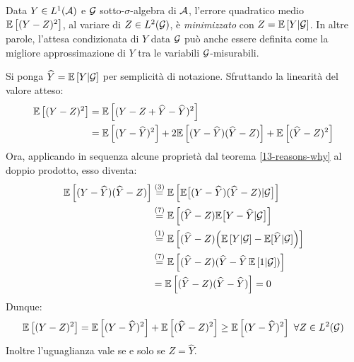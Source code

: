 \medskip
\begin{prop}
  Data $Y \in L^1(\mathcal A)$ e $\mathcal G$ sotto-$\sigma$-algebra di $\mathcal A$, l'errore quadratico medio $\mathbb E \left[ (Y-Z)^2 \right]$, al variare di $Z \in L^2(\mathcal G)$, è \emph{minimizzato} con $Z = \mathbb E \left[ Y|\mathcal G \right]$. In altre parole, l'attesa condizionata di $Y$ data $\mathcal G$ può anche essere definita come la migliore approssimazione di $Y$ tra le variabili $\mathcal G$-misurabili.
\end{prop}
\begin{dimo}
  Si ponga $\widehat Y = \mathbb E \left[ Y|\mathcal G \right]$ per semplicità di notazione. Sfruttando la linearità del valore atteso:
  \begin{align*}
    \mathbb E \left[ (Y-Z)^2 \right] &= \mathbb E \left[ (Y-Z+\widehat Y-\widehat Y)^2 \right] \\
    &= \mathbb E \left[ (Y-\widehat Y)^2 \right] + 2 \mathbb E \left[ (Y-\widehat Y)(\widehat Y - Z) \right] + \mathbb E \left[ (\widehat Y-Z)^2 \right]
  \end{align*}
  Ora, applicando in sequenza alcune proprietà dal teorema \ref{13-reasons-why} al doppio prodotto, esso diventa:
  \begin{align*}
	\mathbb E \left[ (Y-\widehat Y)(\widehat Y-Z) \right]
	&\overset{(3)}{=} \mathbb E \left[  \mathbb E \big[{(Y-\widehat Y)(\widehat Y-Z)|\mathcal G}\big] \right] \\ &\overset{(7)}{=} \mathbb E \left[ (\widehat Y-Z) \mathbb E \big[ Y-\widehat Y|\mathcal G \big] \right] \\
	&\overset{(1)}{=} \mathbb E \left[  (\widehat Y-Z) \Big( \mathbb E \left[ Y|\mathcal G \right] - \mathbb E [ \widehat Y|\mathcal G] \Big)  \right] \\
	&\overset{(7)}{=} \mathbb E \left[ (\widehat Y-Z)(\widehat Y- \widehat Y \, \mathbb E \left[ 1|\mathcal G \right]) \right] \\
	&= \mathbb E \left[ (\widehat Y-Z)(\widehat Y-\widehat Y) \right]
  = 0
  \end{align*}
  Dunque:
  $$\mathbb E \left[ (Y-Z)^2 \right] = \mathbb E \left[ (Y-\widehat Y)^2 \right] + \mathbb E \left[ (\widehat Y-Z)^2 \right]
  \geq \mathbb E \left[ (Y-\widehat Y)^2 \right] \ \forall Z \in L^2(\mathcal G)$$
  Inoltre l'uguaglianza vale se e solo se $Z = \widehat Y$. \qedhere
\end{dimo}

